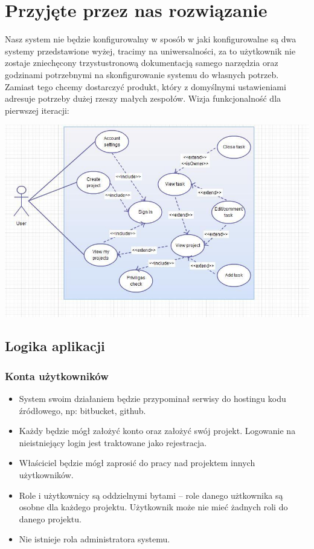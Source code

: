 \documentclass[a4paper,12pt,notitlepage]{mwrep}
\begin{document}
\section{Przyjęte przez nas rozwiązanie}
Nasz system nie będzie konfigurowalny w sposób w jaki konfigurowalne są dwa systemy przedstawione wyżej,
tracimy na uniwersalności, za to użytkownik nie zostaje zniechęcony trzystustronową dokumentacją
samego narzędzia oraz godzinami potrzebnymi na skonfigurowanie systemu do własnych potrzeb.\\
Zamiast tego chcemy dostarczyć produkt, który z domyślnymi ustawieniami adresuje potrzeby dużej rzeszy małych zespołów.\te
Wizja funkcjonalność dla pierwszej iteracji:
\begin{center}	
\vspace{4ex}	
	\includegraphics[scale=0.7]{images/use_case_1.png} \\
\vspace{4ex}
\end{center}
\subsection{Logika aplikacji}
\subsubsection{Konta użytkowników}
\begin{itemize}
	\item	System swoim działaniem będzie przypominał serwisy do hostingu kodu źródłowego, np: bitbucket, github.
	\item	Każdy będzie mógł założyć konto oraz założyć swój projekt.
			Logowanie na nieistniejący login jest traktowane jako rejestracja.
	\item	Właściciel będzie mógł zaprosić do pracy nad projektem innych użytkowników.
	\item	Role i użytkownicy są oddzielnymi bytami -- role danego użtkownika są osobne dla każdego projektu.
			Użytkownik może nie mieć żadnych roli do danego projektu.
	\item	Nie istnieje rola administratora systemu.
\end{itemize}
\end{document}
